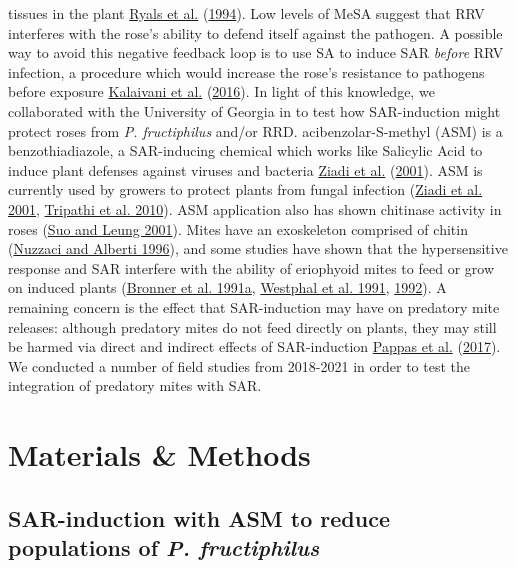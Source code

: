 \documentclass[12pt,final,CPage]{ufthesis}
\begin{document}
{tissues in the plant \protect\hyperlink{ref-Ryals1994}{Ryals et al.} (\protect\hyperlink{ref-Ryals1994}{1994}). Low levels of MeSA suggest that RRV interferes with the rose's ability to defend itself against the pathogen. A possible way to avoid this negative feedback loop is to use SA to induce SAR \emph{before} RRV infection, a procedure which would increase the rose's resistance to pathogens before exposure \protect\hyperlink{ref-Kalaivani2016}{Kalaivani et al.} (\protect\hyperlink{ref-Kalaivani2016}{2016}). In light of this knowledge, we collaborated with the University of Georgia in to test how SAR-induction might protect roses from \emph{P. fructiphilus} and/or RRD. acibenzolar-S-methyl (ASM) is a benzothiadiazole, a SAR-inducing chemical which works like Salicylic Acid to induce plant defenses against viruses and bacteria \protect\hyperlink{ref-Ziadi2001}{Ziadi et al.} (\protect\hyperlink{ref-Ziadi2001}{2001}). ASM is currently used by growers to protect plants from fungal infection (\protect\hyperlink{ref-Ziadi2001}{Ziadi et al. 2001}, \protect\hyperlink{ref-Tripathi2010}{Tripathi et al. 2010}). ASM application also has shown chitinase activity in roses (\protect\hyperlink{ref-Suo2001}{Suo and Leung 2001}). Mites have an exoskeleton comprised of chitin (\protect\hyperlink{ref-Nuzzaci1996a}{Nuzzaci and Alberti 1996}), and some studies have shown that the hypersensitive response and SAR interfere with the ability of eriophyoid mites to feed or grow on induced plants (\protect\hyperlink{ref-Bronner1991a}{Bronner et al. 1991a}, \protect\hyperlink{ref-Westphal1991}{Westphal et al. 1991}, \protect\hyperlink{ref-Westphal1992}{1992}). A remaining concern is the effect that SAR-induction may have on predatory mite releases: although predatory mites do not feed directly on plants, they may still be harmed via direct and indirect effects of SAR-induction \protect\hyperlink{ref-Pappas2017}{Pappas et al.} (\protect\hyperlink{ref-Pappas2017}{2017}). We conducted a number of field studies from 2018-2021 in order to test the integration of predatory mites with SAR.

  \hypertarget{mm-asm-ipm}{%
  \section{Materials \& Methods}\label{mm-asm-ipm}}

  \hypertarget{ipm-actigard}{%
  \subsection{\texorpdfstring{SAR-induction with ASM to reduce populations of \emph{P. fructiphilus}}{SAR-induction with ASM to reduce populations of P. fructiphilus}}\label{ipm-actigard}}

}
\end{document}
